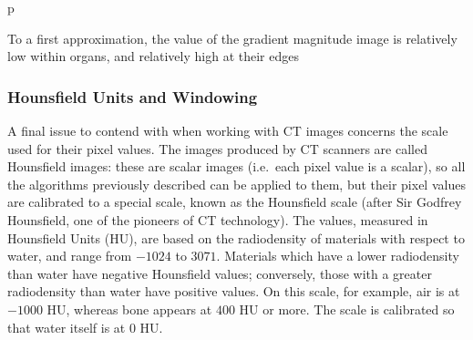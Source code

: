\begin{stusubfig}{p}
	\hspace{4mm}%
\caption{To a first approximation, the value of the gradient magnitude image is relatively low within organs, and relatively high at their edges}
\label{fig:segmentation-watershed-gradientmagnitude}
\end{stusubfig}

\subsubsection{Hounsfield Units and Windowing}

A final issue to contend with when working with CT images concerns the scale used for their pixel values. The images produced by CT scanners are called Hounsfield images: these are scalar images (i.e.~each pixel value is a scalar), so all the algorithms previously described can be applied to them, but their pixel values are calibrated to a special scale, known as the Hounsfield scale (after Sir Godfrey Hounsfield, one of the pioneers of CT technology). The values, measured in Hounsfield Units (HU), are based on the radiodensity of materials with respect to water, and range from $-1024$ to $3071$. Materials which have a lower radiodensity than water have negative Hounsfield values; conversely, those with a greater radiodensity than water have positive values. On this scale, for example, air is at $-1000$ HU, whereas bone appears at $400$ HU or more. The scale is calibrated so that water itself is at $0$ HU.

